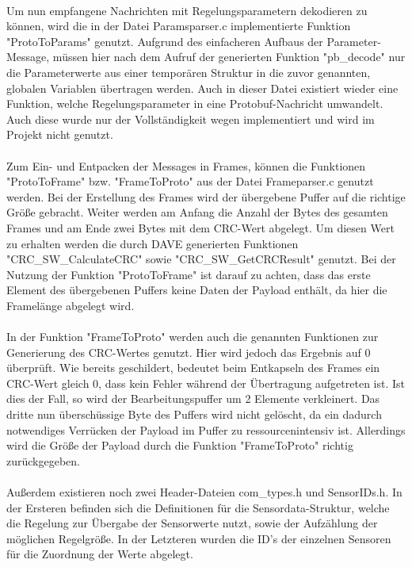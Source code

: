 \paragraph{}
Um nun empfangene Nachrichten mit Regelungsparametern dekodieren zu können, wird die in der Datei Paramsparser.c implementierte Funktion "ProtoToParams" genutzt. Aufgrund des einfacheren Aufbaus der Parameter-Message, müssen hier nach dem Aufruf der generierten Funktion "pb\_decode" nur die Parameterwerte aus einer temporären Struktur in die zuvor genannten, globalen Variablen übertragen werden. Auch in dieser Datei existiert wieder eine Funktion, welche Regelungsparameter in eine Protobuf-Nachricht umwandelt. Auch diese wurde nur der Vollständigkeit wegen implementiert und wird im Projekt nicht genutzt.
\paragraph{}
Zum Ein- und Entpacken der Messages in Frames, können die Funktionen "ProtoToFrame" bzw. "FrameToProto" aus der Datei Frameparser.c genutzt werden. Bei der Erstellung des Frames wird der übergebene Puffer auf die richtige Größe gebracht. Weiter werden am Anfang die Anzahl der Bytes des gesamten Frames und am Ende zwei Bytes mit dem CRC-Wert abgelegt. Um diesen Wert zu erhalten werden die durch DAVE generierten Funktionen "CRC\_SW\_CalculateCRC" sowie "CRC\_SW\_GetCRCResult" genutzt. Bei der Nutzung der Funktion "ProtoToFrame" ist darauf zu achten, dass das erste Element des übergebenen Puffers keine Daten der Payload enthält, da hier die Framelänge abgelegt wird.
\paragraph{}
In der Funktion "FrameToProto" werden auch die genannten Funktionen zur Generierung des CRC-Wertes genutzt. Hier wird jedoch das Ergebnis auf 0 überprüft. Wie bereits geschildert, bedeutet beim Entkapseln des Frames ein CRC-Wert gleich 0, dass kein Fehler während der Übertragung aufgetreten ist. Ist dies der Fall, so wird der Bearbeitungspuffer um 2 Elemente verkleinert. Das dritte nun überschüssige Byte des Puffers wird nicht gelöscht, da ein dadurch notwendiges Verrücken der Payload im Puffer zu ressourcenintensiv ist. Allerdings wird die Größe der Payload durch die Funktion "FrameToProto" richtig zurückgegeben.
\paragraph{}
Außerdem existieren noch zwei Header-Dateien com\_types.h und SensorIDs.h. In der Ersteren befinden sich die Definitionen für die Sensordata-Struktur, welche die Regelung zur Übergabe der Sensorwerte nutzt, sowie der Aufzählung der möglichen Regelgröße. In der Letzteren wurden die ID's der einzelnen Sensoren für die Zuordnung der Werte abgelegt.
